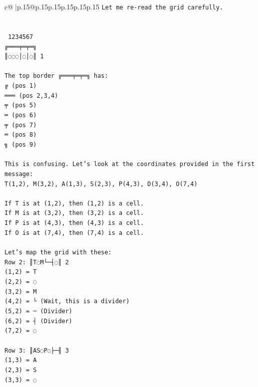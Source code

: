 \documentclass{article}
\begin{document}
{\begin{supertabular}{c@{$\;$}|p{.15\linewidth}@{}p{.15\linewidth}p{.15\linewidth}p{.15\linewidth}p{.15\linewidth}p{.15\linewidth}}
{{{\texttt{Let me re{-}read the grid carefully.} \\
\\ 
\\ 
\texttt{ 1234567} \\
\texttt{╔═══╤═╤═╗} \\
\texttt{║◌◌◌│◌│◌║ 1} \\
\\ 
\texttt{The top border ╔═══╤═╤═╗ has:} \\
\texttt{╔ (pos 1)} \\
\texttt{═══ (pos 2,3,4)} \\
\texttt{╤ (pos 5)} \\
\texttt{═ (pos 6)} \\
\texttt{╤ (pos 7)} \\
\texttt{═ (pos 8)} \\
\texttt{╗ (pos 9)} \\
\\ 
\texttt{This is confusing. Let's look at the coordinates provided in the first message:} \\
\texttt{T(1,2), M(3,2), A(1,3), S(2,3), P(4,3), D(3,4), O(7,4)} \\
\\ 
\texttt{If T is at (1,2), then (1,2) is a cell.} \\
\texttt{If M is at (3,2), then (3,2) is a cell.} \\
\texttt{If P is at (4,3), then (4,3) is a cell.} \\
\texttt{If O is at (7,4), then (7,4) is a cell.} \\
\\ 
\texttt{Let's map the grid with these:} \\
\texttt{Row 2: ║T◌M└─┤◌║ 2} \\
\texttt{(1,2) = T} \\
\texttt{(2,2) = ◌} \\
\texttt{(3,2) = M} \\
\texttt{(4,2) = └ (Wait, this is a divider)} \\
\texttt{(5,2) = ─ (Divider)} \\
\texttt{(6,2) = ┤ (Divider)} \\
\texttt{(7,2) = ◌} \\
\\ 
\texttt{Row 3: ║AS◌P◌├─╢ 3} \\
\texttt{(1,3) = A} \\
\texttt{(2,3) = S} \\
\texttt{(3,3) = ◌} \\
}}}
\end{supertabular}}
\end{document}
